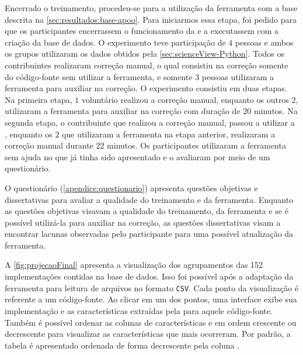 		Encerrado o treinamento, procedeu-se para a utilização da ferramenta com a base
		descrita na \cref{sec:resultados:base-apoo}. Para iniciarmos essa etapa, foi
		pedido para que os participantes encerrassem o funcionamento da 
		e a executassem com a criação da base de dados. O experimento teve participação
		de $4$ pessoas e ambos os grupos utilizaram os dados obtidos pela 
		\cref{sec:scienceView-Python}. Todos os contribuintes realizaram  correção manual,
		o qual consistiu na correção somente do código-fonte sem utilizar a ferramenta, e
		somente $3$ pessoas utilizaram a ferramenta  para auxiliar
		na correção. O experimento consistiu em duas etapas. Na primeira etapa, $1$
		voluntário realizou a correção manual, enquanto os outros $2$, utilizaram a
		ferramenta para auxiliar na correção com duração de $20$ minutos. Na segunda
		etapa, o contribuinte que realizou a correção manual, passou a utilizar a
		, enquanto os $2$ que utilizaram a ferramenta na etapa
		anterior, realizaram a correção manual durante $22$ minutos. Os participantes
		utilizaram a ferramenta sem ajuda no que já tinha sido apresentado e o
		avaliaram por meio de um questionário.		
		
		O questionário (\cref{apendice:questionario}) apresenta questões objetivas e
		dissertativas para avaliar a qualidade do treinamento e da ferramenta. Enquanto
		as questões objetivas visavam a qualidade do treinamento, da ferramenta e se
		é possível utilizá-la para auxiliar na correção, as questões dissertativas
		visam a encontrar lacunas observadas pelo participante para uma possível 
		atualização da ferramenta.
		
		A \cref{fig:projecaoFinal} apresenta a visualização dos agrupamentos das 152
		implementações contidas na base de dados. Isso foi possível após a adaptação da
		ferramenta para leitura de arquivos no formato \texttt{CSV}. Cada ponto da
		visualização é referente a um código-fonte. Ao clicar em um dos pontos,
		uma interface exibe sua implementação e as características extraídas pela
		 para aquele código-fonte. Também é possível ordenar
		as colunas de características  e  em
		ordem  crescente ou decrescente para visualizar as características que mais
		ocorreram. Por padrão, a tabela é apresentado ordenada de forma decrescente
		pela coluna .
	

